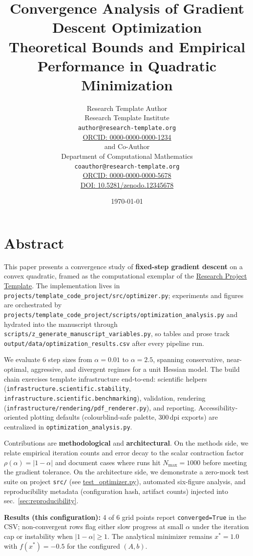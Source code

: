 \documentclass[
]{article}
\author{}
\date{}
\title{Convergence Analysis of Gradient Descent Optimization\\\normalsize Theoretical Bounds and Empirical Performance in Quadratic Minimization}
\author{Research Template Author\\\footnotesize{Research Template Institute}\\\footnotesize{\texttt{author@research-template.org}}\\\footnotesize{\href{https://orcid.org/0000-0000-0000-1234}{ORCID: 0000-0000-0000-1234}} \\and Co-Author\\\footnotesize{Department of Computational Mathematics}\\\footnotesize{\texttt{coauthor@research-template.org}}\\\footnotesize{\href{https://orcid.org/0000-0000-0000-5678}{ORCID: 0000-0000-0000-5678}} \\ \footnotesize{\href{https://doi.org/10.5281/zenodo.12345678}{DOI: 10.5281/zenodo.12345678}}}
\date{\today}
\begin{document}
\maketitle
\thispagestyle{empty}
\tableofcontents
\newpage


\section{Abstract}\label{sec:abstract}

This paper presents a convergence study of \textbf{fixed-step gradient
descent} on a convex quadratic, framed as the computational exemplar of
the \href{https://github.com/docxology/template}{Research Project
Template}. The implementation lives in
\texttt{projects/template\_code\_project/src/optimizer.py}; experiments
and figures are orchestrated by
\texttt{projects/template\_code\_project/scripts/optimization\_analysis.py}
and hydrated into the manuscript through
\texttt{scripts/z\_generate\_manuscript\_variables.py}, so tables and
prose track \texttt{output/data/optimization\_results.csv} after every
pipeline run.

We evaluate 6 step sizes from \(\alpha = 0.01\) to \(\alpha = 2.5\),
spanning conservative, near-optimal, aggressive, and divergent regimes
for a unit Hessian model. The build chain exercises template
infrastructure end-to-end: scientific helpers
(\texttt{infrastructure.scientific.stability},
\texttt{infrastructure.scientific.benchmarking}), validation, rendering
(\texttt{infrastructure/rendering/pdf\_renderer.py}), and reporting.
Accessibility-oriented plotting defaults (colourblind-safe palette,
300\,dpi exports) are centralized in \texttt{optimization\_analysis.py}.

Contributions are \textbf{methodological} and \textbf{architectural}. On
the methods side, we relate empirical iteration counts and error decay
to the scalar contraction factor \(\rho(\alpha) = |1-\alpha|\) and
document cases where runs hit \(N_{\max} = 1000\) before meeting the
gradient tolerance. On the architecture side, we demonstrate a zero-mock
test suite on project \texttt{src/} (see
\href{https://github.com/docxology/template/blob/main/projects/template_code_project/tests/test_optimizer.py}{test\_optimizer.py}),
automated six-figure analysis, and reproducibility metadata
(configuration hash, artifact counts) injected into
sec.~\ref{sec:reproducibility}.

\textbf{Results (this configuration):} 4 of 6 grid points report
\texttt{converged=True} in the CSV; non-convergent rows flag either slow
progress at small \(\alpha\) under the iteration cap or instability when
\(|1-\alpha| \geq 1\). The analytical minimizer remains \(x^\ast = 1.0\)
with \(f(x^\ast) = -0.5\) for the configured \((A,b)\).
\end{document}
